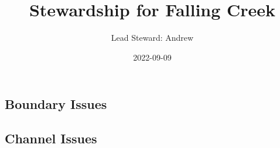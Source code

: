 \documentclass[
  landscape]{article}
\title{Stewardship for Falling Creek}
\author{Lead Steward: Andrew}
\date{2022-09-09}
\begin{document}
\maketitle

\hypertarget{boundary-issues}{%
\subsection{Boundary Issues}\label{boundary-issues}}

\textbar\textbar{} \textbar\textbar{} \textbar\textbar{}
\textbar\textbar{}

\hypertarget{channel-issues}{%
\subsection{Channel Issues}\label{channel-issues}}
\end{document}
